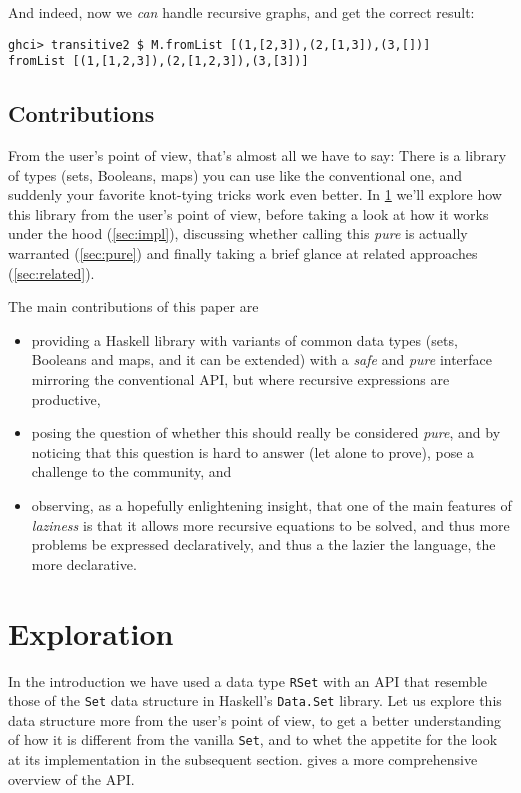 \documentclass[manuscript,screen,acmsmall]{acmart}
\begin{document}
And indeed, now we \emph{can} handle recursive graphs, and get the correct result:
\begin{verbatim}
ghci> transitive2 $ M.fromList [(1,[2,3]),(2,[1,3]),(3,[])]
fromList [(1,[1,2,3]),(2,[1,2,3]),(3,[3])]
\end{verbatim}

\subsection{Contributions}

From the user’s point of view, that’s almost all we have to say: There is a library of types (sets, Booleans, maps) you can use like the conventional one, and suddenly your favorite knot-tying tricks work even better. In \cref{sec:exploration} we'll explore how this library from the user's point of view, before taking a look at how it works under the hood (\cref{sec:impl}), discussing whether calling this \emph{pure} is actually warranted (\cref{sec:pure}) and finally taking a brief glance at related approaches (\cref{sec:related}).

The main contributions of this paper are
\begin{itemize}
\item providing a Haskell library with variants of common data types (sets, Booleans and maps, and it can be extended) with a \emph{safe} and \emph{pure} interface mirroring the conventional API, but where recursive expressions are productive,
\item posing the question of whether this should really be considered \emph{pure}, and by noticing that this question is hard to answer (let alone to prove), pose a challenge to the community, and
\item observing, as a hopefully enlightening insight, that one of the main features of \emph{laziness} is that it allows more recursive equations to be solved, and thus more problems be expressed declaratively, and thus a the lazier the language, the more declarative.
\end{itemize}

\section{Exploration}\label{sec:exploration}

In the introduction we have used a data type \verb|RSet| with an API that resemble those of the \verb|Set| data structure in Haskell's \verb|Data.Set| library. Let us explore this data structure more from the user's point of view, to get a better understanding of how it is different from the vanilla \verb|Set|, and to whet the appetite for the look at its implementation in the subsequent section.
 gives a more comprehensive overview of the API.
\end{document}
